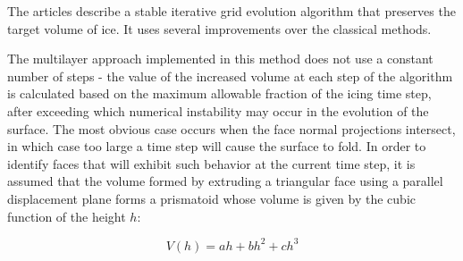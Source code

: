 The articles \cite{Thompson,Tong} describe a stable iterative grid evolution algorithm that preserves the target volume of ice.
It uses several improvements over the classical methods.

The multilayer approach implemented in this method does not use a constant number of steps - the value of the increased volume at each step of the algorithm is calculated based on the maximum allowable fraction of the icing time step, after exceeding which numerical instability may occur in the evolution of the surface.
The most obvious case occurs when the face normal projections intersect, in which case too large a time step will cause the surface to fold.
In order to identify faces that will exhibit such behavior at the current time step, it is assumed that the volume formed by extruding a triangular face using a parallel displacement plane forms a prismatoid whose volume is given by the cubic function of the height $h$:

\begin{equation}\label{Tong:1}
V(h)=ah+bh^2+ch^3
\end{equation}

